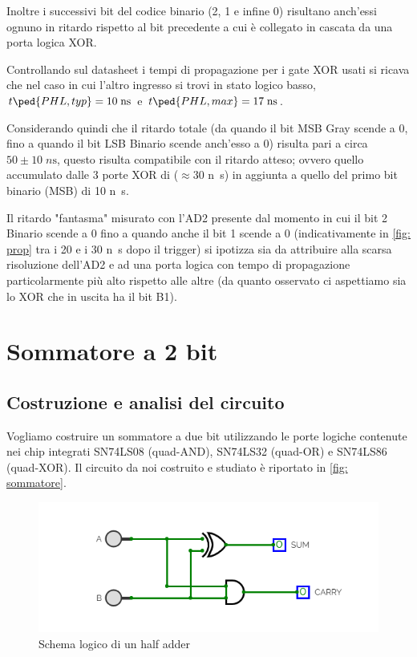 \documentclass[10pt, a4paper, italian]{article}
\begin{document}
Inoltre i successivi bit del codice binario (2, 1 e infine 0) risultano
anch'essi ognuno in ritardo rispetto al bit precedente a cui è collegato in
cascata da una porta logica XOR.

Controllando sul datasheet i tempi di propagazione per i gate XOR usati si
ricava che nel caso in cui l'altro ingresso si trovi in stato logico basso,
$t\ped{PHL, typ} = 10 \; \si{n\s}$ e $t\ped{PHL, max} = 17 \; \si{n\s}$.

Considerando quindi che il ritardo totale (da quando il bit MSB Gray scende a
0, fino a quando il bit LSB Binario scende anch'esso a 0) risulta pari a circa
$50 \pm 10 \; \si{n\s}$, questo risulta compatibile con il ritardo atteso;
ovvero quello accumulato dalle 3 porte XOR di ($\approx 30$ \si{n\s}) in
aggiunta a quello del primo bit binario (MSB) di 10 \si{n\s}.

Il ritardo "fantasma" misurato con l'AD2 presente dal momento in cui il bit
2 Binario scende a 0 fino a quando anche il bit 1 scende a 0 (indicativamente
in \cref{fig: prop} tra i 20 e i 30 \si{n\s} dopo il trigger) si ipotizza sia
da attribuire alla scarsa risoluzione dell'AD2 e ad una porta logica con tempo
di propagazione particolarmente più alto rispetto alle altre (da quanto
osservato ci aspettiamo sia lo XOR che in uscita ha il bit B1).

\section{Sommatore a 2 bit}
\subsection{Costruzione e analisi del circuito}
Vogliamo costruire un sommatore a due bit utilizzando le porte logiche
contenute nei chip integrati SN74LS08 (quad-AND), SN74LS32 (quad-OR) e
SN74LS86 (quad-XOR). Il circuito da noi costruito e studiato è riportato in
\cref{fig: sommatore}.
\begin{figure}[htbp]
    \centering
    \includegraphics[width=0.6\linewidth]{half}
    \caption{Schema logico di un half adder
    \label{fig: halfadder}}
\end{figure}
\end{document}
